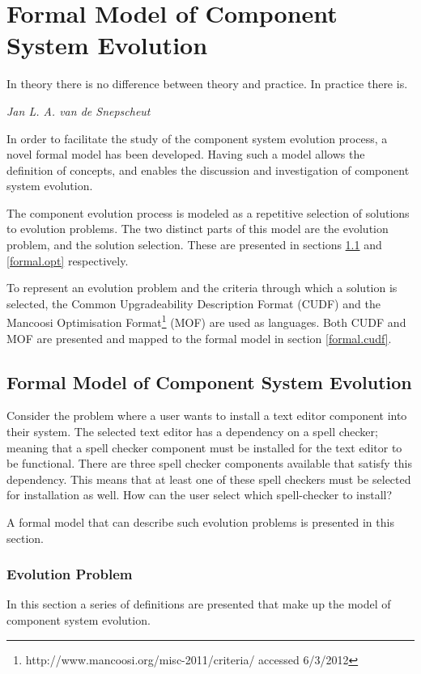 \chapter{Formal Model of Component System Evolution}
\label{formal}
\epigraph{In theory there is no difference between theory and practice. In practice there is.}
{\textit{Jan L. A. van de Snepscheut}}
In order to facilitate the study of the component system evolution process, a novel formal model has been developed.
Having such a model allows the definition of concepts, and enables the discussion and investigation of component system evolution.

The component evolution process is modeled as a repetitive selection of solutions to evolution problems.
The two distinct parts of this model are the evolution problem, and the solution selection.
These are presented in sections \ref{formal.step} and \ref{formal.opt} respectively.

To represent an evolution problem and the criteria through which a solution is selected,
the Common Upgradeability Description Format (CUDF) \citep{treinen2009common}
and the Mancoosi Optimisation Format\footnote{http://www.mancoosi.org/misc-2011/criteria/ accessed 6/3/2012} (MOF) are used as languages.
Both CUDF and MOF are presented and mapped to the formal model in section \ref{formal.cudf}. 

\section{Formal Model of Component System Evolution}
\label{formal.step}
Consider the problem where a user wants to install a text editor component into their system.
The selected text editor has a dependency on a spell checker;
meaning that a spell checker component must be installed for the text editor to be functional.
There are three spell checker components available that satisfy this dependency.
This means that at least one of these spell checkers must be selected for installation as well.
How can the user select which spell-checker to install? 

A formal model that can describe such evolution problems is presented in this section.

\subsection{Evolution Problem}
In this section a series of definitions are presented that make up the model of component system evolution.

